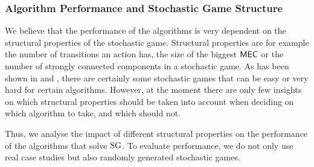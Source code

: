 \subsubsection*{Algorithm Performance and Stochastic Game Structure}
We believe that the performance of the algorithms is very dependent on the structural properties of the stochastic game.
Structural properties are for example the number of transitions an action has, the size of the biggest $\mathsf{MEC}$ or the number of strongly connected components in a stochastic game.
As has been shown in \cite{GANDALFpaper} and \cite{haddadmonmege}, there are certainly some stochastic games that can be easy or very hard for certain algorithms.
However, at the moment there are only few insights on which structural properties should be taken into account when deciding on which algorithm to take, and which should not.

Thus, we analyse the impact of different structural properties on the performance of the algorithms that solve $\textrm{SG}$.
To evaluate performance, we do not only use real case studies but also randomly generated stochastic games.